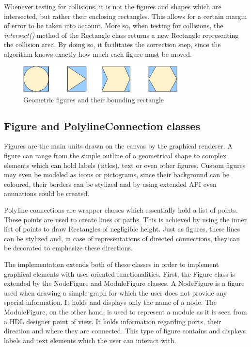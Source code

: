 Whenever testing for collisions, it is not the figures and shapes which are intersected, but rather their 
enclosing rectangles. This allows for a certain margin of error to be taken into account. More so, when 
testing for collisions, the \emph{intersect()} method of the Rectangle class returns a new Rectangle 
representing the collision area. By doing so, it facilitates the correction step, since the algorithm 
knows exactly how much each figure must be moved.

\begin{figure}[ht] \centering
\includegraphics[width=0.75\textwidth]{img/implementation/rectangles.png}
\caption{Geometric figures and their bounding rectangle} \end{figure}

\subsection{Figure and PolylineConnection classes}

Figures are the main units drawn on the canvas by the graphical renderer. A figure can 
range from the simple outline of a geometrical shape to complex elements which can hold labels (titles), text 
or even other figures. Custom figures may even be modeled as icons or pictograms, since their background can be 
coloured, their borders can be stylized and by using extended API even animations could be created.

Polyline connections are wrapper classes which essentially hold a list of points. These points are used to create 
lines or paths. This is achieved by using the inner list of points to draw Rectangles of negligible height. Just 
as figures, these lines can be stylized and, in case of representations of directed connections, they can be 
decorated to emphasize these directions.

The implementation extends both of these classes in order to implement graphical elements with user oriented 
functionalities. First, the Figure class is extended by the NodeFigure and ModuleFigure classes. A NodeFigure 
is a figure used when drawing a simple graph for which the user does not provide any special information.
It holds and displays only the name of a node. The ModuleFigure, on the other hand, is used to represent a 
module as it is seen from a HDL designer point of view. It holds information regarding ports, their direction 
and where they are connected. This type of figure contains and displays labels and text elements which the user 
can interact with.

